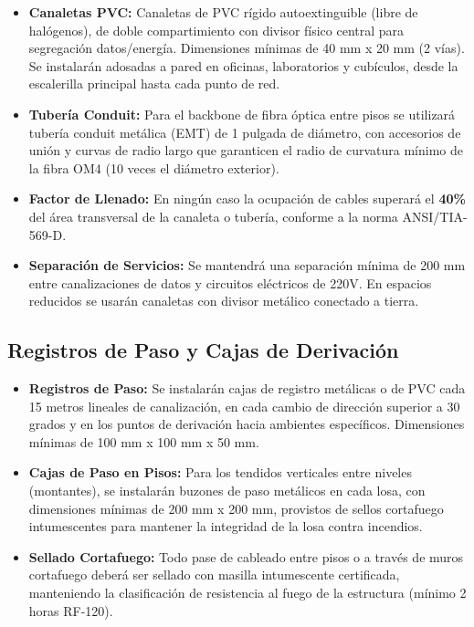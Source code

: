 \begin{itemize}
    \item \textbf{Canaletas PVC:} Canaletas de PVC rígido autoextinguible (libre de halógenos), de doble compartimiento con divisor físico central para segregación datos/energía. Dimensiones mínimas de 40 mm x 20 mm (2 vías). Se instalarán adosadas a pared en oficinas, laboratorios y cubículos, desde la escalerilla principal hasta cada punto de red.
    \item \textbf{Tubería Conduit:} Para el backbone de fibra óptica entre pisos se utilizará tubería conduit metálica (EMT) de 1 pulgada de diámetro, con accesorios de unión y curvas de radio largo que garanticen el radio de curvatura mínimo de la fibra OM4 (10 veces el diámetro exterior).
    \item \textbf{Factor de Llenado:} En ningún caso la ocupación de cables superará el \textbf{40\%} del área transversal de la canaleta o tubería, conforme a la norma ANSI/TIA-569-D.
    \item \textbf{Separación de Servicios:} Se mantendrá una separación mínima de 200 mm entre canalizaciones de datos y circuitos eléctricos de 220V. En espacios reducidos se usarán canaletas con divisor metálico conectado a tierra.
\end{itemize}

\subsection*{Registros de Paso y Cajas de Derivación}

\begin{itemize}
    \item \textbf{Registros de Paso:} Se instalarán cajas de registro metálicas o de PVC cada 15 metros lineales de canalización, en cada cambio de dirección superior a 30 grados y en los puntos de derivación hacia ambientes específicos. Dimensiones mínimas de 100 mm x 100 mm x 50 mm.
    \item \textbf{Cajas de Paso en Pisos:} Para los tendidos verticales entre niveles (montantes), se instalarán buzones de paso metálicos en cada losa, con dimensiones mínimas de 200 mm x 200 mm, provistos de sellos cortafuego intumescentes para mantener la integridad de la losa contra incendios.
    \item \textbf{Sellado Cortafuego:} Todo pase de cableado entre pisos o a través de muros cortafuego deberá ser sellado con masilla intumescente certificada, manteniendo la clasificación de resistencia al fuego de la estructura (mínimo 2 horas RF-120).
\end{itemize}

